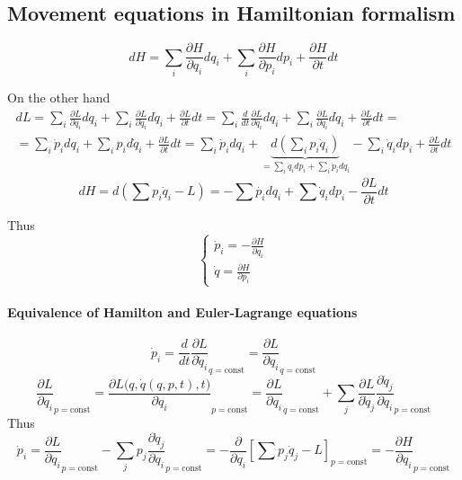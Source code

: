 \subsection{Movement equations in Hamiltonian formalism}
$$dH = \sum_i \frac{\partial H}{\partial q_i}dq_i+\sum_i \frac{\partial H}{\partial p_i}dp_i+ \frac{\partial H}{\partial t}dt$$

On the other hand
\begin{align*}
dL =  \sum_i \frac{\partial L}{\partial q_i}dq_i+\sum_i \frac{\partial L}{\partial\dot{q}_i}d\dot{q}_i+ \frac{\partial L}{\partial t}dt = \sum_i \frac{d}{dt}\frac{\partial L}{\partial \dot{q}_i}dq_i+\sum_i \frac{\partial L}{\partial\dot{q}_i}d\dot{q}_i+ \frac{\partial L}{\partial t}dt =\\= \sum_i \dot{p}_i dq_i+\sum_i p_i d\dot{q}_i+ \frac{\partial L}{\partial t}dt = \sum_i \dot{p}_i dq_i+\underbrace{d \left(\sum_i p_i \dot{q}_i\right)}_{=\sum_i \dot{q}_i d p_i+\sum_i \dot{p}_i d q_i}- \sum_i \dot{q}_i d p_i+ \frac{\partial L}{\partial t}dt
\end{align*}
$$dH = d\left( \sum p_i \dot{q}_i - L \right) = -\sum \dot{p_i} dq_i + \sum \dot{q}_i dp_i - \frac{\partial L}{\partial t}dt$$

Thus
$$\begin{cases}
\dot{p}_i = -\frac{\partial H}{\partial q_i} \\
\dot{q} = \frac{\partial H}{\partial p_i}
\end{cases}$$

\paragraph{Equivalence of Hamilton and Euler-Lagrange equations}
$$\dot{p}_i = \frac{d}{dt} \frac{\partial L}{\partial \dot{q}_i}_{q=\text{const}}=  \frac{\partial L}{\partial q_i}_{\dot{q}=\text{const}}$$
$$\frac{\partial L}{\partial q_i}_{p=\text{const}}=\frac{\partial L\big( q, \dot{q}(q,p,t),t \big)}{\partial q_i}_{p=\text{const}}=\frac{\partial L}{\partial q_i}_{\dot{q}=\text{const}} + \sum_j \frac{\partial L}{\partial \dot{q}_j}\frac{\partial \dot{q}_j}{\partial q_i}_{p=\text{const}}$$
Thus
$$\dot{p}_i = \frac{\partial L}{\partial q_i}_{p=\text{const}} - \sum_j p_j\frac{\partial \dot{q}_j}{\partial q_i}_{p=\text{const}} = -\frac{\partial }{\partial q_i}\left[ \sum p_j \dot{q}_j - L \right]_{p=\text{const}} = -\frac{\partial H}{\partial q_i}_{p=\text{const}}$$


